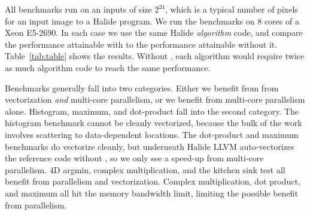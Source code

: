 All benchmarks run on an inputs of size $2^{24}$, which is a typical number of pixels for an input image to a Halide program. We run the benchmarks on 8 cores of a Xeon E5-2690. In each case we use the same Halide \emph{algorithm} code, and compare the performance attainable with  to the performance attainable without it. Table~\ref{tab:table} shows the results. Without , each algorithm would require twice as much algorithm code to reach the same performance.

Benchmarks generally fall into two categories. Either we benefit from from vectorization \emph{and} multi-core parallelism, or we benefit from multi-core parallelism alone. Histogram, maximum, and dot-product fall into the second category. The histogram benchmark cannot be cleanly vectorized, because the bulk of the work involves scattering to data-dependent locations. The dot-product and maximum benchmarks do vectorize cleanly, but underneath Halide LLVM auto-vectorizes the reference code without , so we only see a speed-up from multi-core parallelism. 4D argmin, complex multiplication, and the kitchen sink test all benefit from parallelism and vectorization. Complex multiplication, dot product, and maximum all hit the memory bandwidth limit, limiting the possible benefit from parallelism.




